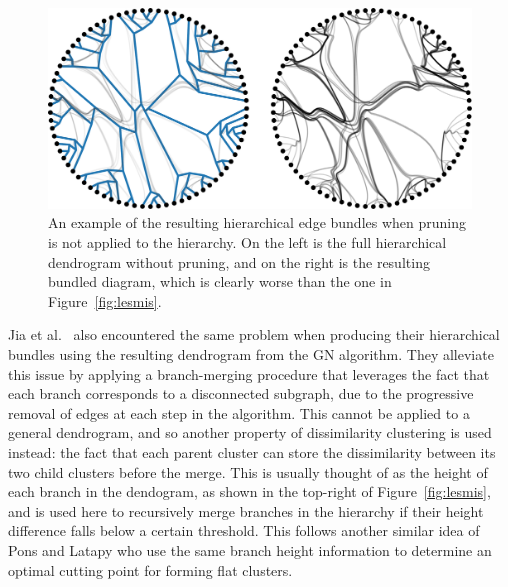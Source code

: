 \begin{figure}
  \centering
  \includegraphics[width=.9\textwidth]{power/pruning.pdf}
  \caption[Hierarchical edge bundles without pruning]{An example of the resulting hierarchical edge bundles when pruning is not applied to the hierarchy. On the left is the full hierarchical dendrogram without pruning, and on the right is the resulting bundled diagram, which is clearly worse than the one in Figure~\ref{fig:lesmis}.}
  \label{fig:pruning}   
\end{figure}

Jia et al.\ \cite{Jia2011} also encountered the same problem when producing their hierarchical bundles using the resulting dendrogram from the GN algorithm. They alleviate this issue by applying a branch-merging procedure that leverages the fact that each branch corresponds to a disconnected subgraph, due to the progressive removal of edges at each step in the algorithm.
This cannot be applied to a general dendrogram, and so another property of dissimilarity clustering is used instead: the fact that each parent cluster can store the dissimilarity between its two child clusters before the merge. This is usually thought of as the height of each branch in the dendogram, as shown in the top-right of Figure~\ref{fig:lesmis}, and is used here to recursively merge branches in the hierarchy if their height difference falls below a certain threshold. This follows another similar idea of Pons and Latapy \cite{Pons2006} who use the same branch height information to determine an optimal cutting point for forming flat clusters.

